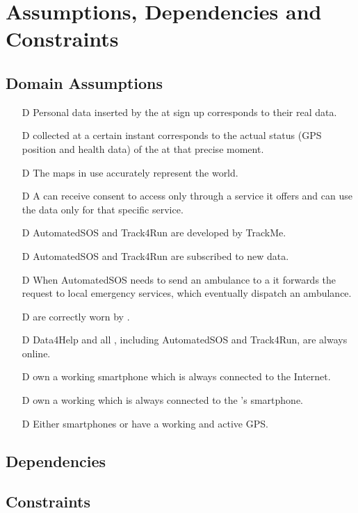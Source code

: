 \documentclass[../../rasd.tex]{subfiles}
\begin{document}
\section{Assumptions, Dependencies and Constraints}
		\subsection{Domain Assumptions}
			 	\begin{itemize}
				 	\item[D\subs{1}]Personal data inserted by the  at sign up corresponds to their real data.
					\item[D\subs{2}] collected at a certain instant corresponds to the actual status (GPS position and health data) of the  at that precise moment.				
					\item[D\subs{3}]The maps in use accurately represent the world.
					\item[D\subs{4}]A  can receive consent to  access only through a service it offers and can use the data only for that specific service.
					\item[D\subs{5}]AutomatedSOS and Track4Run are  developed by TrackMe.
					\item[D\subs{6}]AutomatedSOS and Track4Run are subscribed to new data.
					\item[D\subs{7}]When AutomatedSOS needs to send an ambulance to a  it forwards the request to local emergency services, which eventually dispatch an ambulance.
					\item[D\subs{8}] are correctly worn by .
					\item[D\subs{9}]Data4Help and all , including AutomatedSOS and Track4Run, are always online.
					\item[D\subs{10}] own a working smartphone which is always connected to the Internet.
					\item[D\subs{11}] own a working  which is always connected to the 's smartphone.
					\item[D\subs{12}]Either smartphones or  have a working and active GPS.
				\end{itemize}	
		\subsection{Dependencies}
		\subsection{Constraints}
\end{document}

